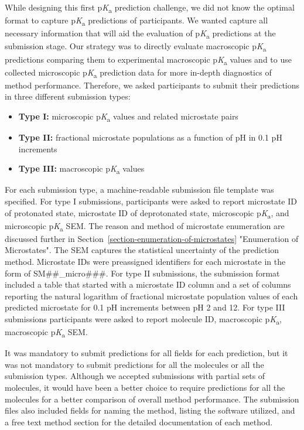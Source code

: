 \documentclass[9pt,lineno,final]{elife}
\newcommand{\pKa}{p\textit{K}\textsubscript{a}}
\begin{document}
While designing this first \pKa{} prediction challenge, we did not know the optimal format to capture \pKa{} predictions of participants. We wanted capture all necessary information that will aid the evaluation of \pKa{} predictions at the submission stage. Our strategy was to directly evaluate macroscopic \pKa{} predictions comparing them to experimental macroscopic \pKa{} values and to use collected microscopic \pKa{} prediction data for more in-depth diagnostics of method performance.
Therefore, we asked participants to submit their predictions in three different submission types: 
\begin{itemize}
\item {\bf Type I:} microscopic \pKa{} values and related microstate pairs
\item {\bf Type II:} fractional microstate populations as a function of pH in 0.1 pH increments
\item {\bf Type III:} macroscopic \pKa{} values
\end{itemize}

For each submission type, a machine-readable submission file template was specified. 
For type I submissions, participants were asked to report microstate ID of protonated state, microstate ID of deprotonated state, microscopic \pKa{}, and microscopic \pKa{} SEM.  The reason and method of microstate enumeration are discussed further in Section~\ref{section-enumeration-of-microstates} "Enumeration of Microstates".
The SEM captures the statistical uncertainty of the prediction method. 
Microstate IDs were preassigned identifiers for each microstate in the form of SM\#\#\_micro\#\#\#. 
For type II submissions, the submission format included a table that started with a microstate ID column and a set of columns reporting the natural logarithm of fractional microstate population values of each predicted microstate for 0.1 pH increments between pH 2 and 12.
For type III submissions participants were asked to report molecule ID, macroscopic \pKa{}, macroscopic \pKa{} SEM.  

It was mandatory to submit predictions for all fields for each prediction, but it was not mandatory to submit predictions for all the molecules or all the submission types. 
Although we accepted submissions with partial sets of molecules, it would have been a better choice to require predictions for all the molecules for a better comparison of overall method performance. 
The submission files also included fields for naming the method, listing the software utilized, and a free text method section for the detailed documentation of each method. 
\end{document}
